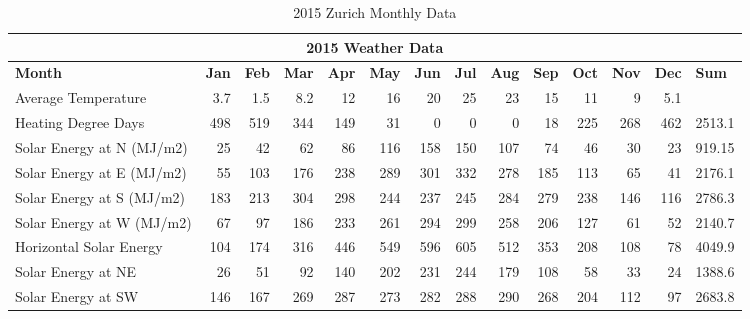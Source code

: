 \documentclass[11pt, a4paper]{article}
\theoremstyle{definition}
\begin{document}
				\begin{table}[H]
				  \centering
				  \small
				\caption{2015 Zurich Monthly Data}
				    \begin{tabular}{|p{5.3em}|r|r|r|r|r|r|r|r|r|r|r|r|r|}
				    \toprule
				    \multicolumn{14}{|c|}{2015 Weather Data} \\
				    \midrule
				    \textbf{Month} & \multicolumn{1}{l|}{\textbf{Jan}} & \multicolumn{1}{l|}{\textbf{Feb}} & \multicolumn{1}{l|}{\textbf{Mar}} & \multicolumn{1}{l|}{\textbf{Apr}} & \multicolumn{1}{l|}{\textbf{May}} & \multicolumn{1}{l|}{\textbf{Jun}} & \multicolumn{1}{l|}{\textbf{Jul}} & \multicolumn{1}{l|}{\textbf{Aug}} & \multicolumn{1}{l|}{\textbf{Sep}} & \multicolumn{1}{l|}{\textbf{Oct}} & \multicolumn{1}{l|}{\textbf{Nov}} & \multicolumn{1}{l|}{\textbf{Dec}} & \multicolumn{1}{l|}{\textbf{Sum}} \\
				    \midrule
				    Average Temperature  & 3.7  & 1.5  & 8.2  & 12   & 16   & 20   & 25   & 23   & 15   & 11   & 9    & 5.1  &  \\
				    \midrule
				    Heating Degree Days & 498  & 519  & 344  & 149  & 31   & 0    & 0    & 0    & 18   & 225  & 268  & 462  & 2513.1 \\
				    \midrule
				    Solar Energy at N (MJ/m2) & 25   & 42   & 62   & 86   & 116  & 158  & 150  & 107  & 74   & 46   & 30   & 23   & 919.15 \\
				    \midrule
				    Solar Energy at E (MJ/m2) & 55   & 103  & 176  & 238  & 289  & 301  & 332  & 278  & 185  & 113  & 65   & 41   & 2176.1 \\
				    \midrule
				    Solar Energy at S (MJ/m2) & 183  & 213  & 304  & 298  & 244  & 237  & 245  & 284  & 279  & 238  & 146  & 116  & 2786.3 \\
				    \midrule
				    Solar Energy at W (MJ/m2) & 67   & 97   & 186  & 233  & 261  & 294  & 299  & 258  & 206  & 127  & 61   & 52   & 2140.7 \\
				    \midrule
				    Horizontal Solar Energy & 104  & 174  & 316  & 446  & 549  & 596  & 605  & 512  & 353  & 208  & 108  & 78   & 4049.9 \\
				    \midrule
				    Solar Energy at NE & 26   & 51   & 92   & 140  & 202  & 231  & 244  & 179  & 108  & 58   & 33   & 24   & 1388.6 \\
				    \midrule
				    Solar Energy at SW & 146  & 167  & 269  & 287  & 273  & 282  & 288  & 290  & 268  & 204  & 112  & 97   & 2683.8 \\
				    \bottomrule
				    \end{tabular}%
				  \label{tab:2015Monthly}%
				\end{table}%
\end{document}
